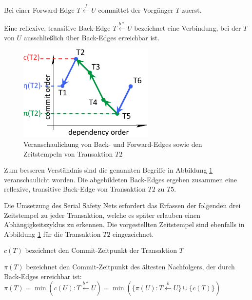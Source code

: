 \begin{Definition}
	Bei einer \textcolor{my-blue}{Forward-Edge} $T\xleftarrow{f} U$ committet der Vorgänger $T$ zuerst.
\end{Definition}

\begin{Definition}
	Eine \textcolor{my-green}{reflexive, transitive Back-Edge} $T\xleftarrow{b*} U$ bezeichnet eine Verbindung, bei der $T$ von $U$ ausschließlich über Back-Edges erreichbar ist.
\end{Definition}

\begin{figure}
	\includegraphics[width=0.8\columnwidth]{img/Figure_2_1.pdf}
	\caption{Veranschaulichung von \textcolor{my-green}{Back}- und \textcolor{my-blue}{Forward-Edges} sowie den Zeitstempeln von Transaktion $T2$}
	\label{fig:back_forward}
\end{figure}

Zum besseren Verständnis sind die genannten Begriffe in Abbildung \ref{fig:back_forward} veranschaulicht worden.
Die abgebildeten Back-Edges ergeben zusammen eine reflexive, transitive Back-Edge von Transaktion $T2$ zu $T5$.

Die Umsetzung des Serial Safety Nets erfordert das Erfassen der folgenden drei Zeitstempel zu jeder Transaktion, welche es später erlauben einen Abhängigkeitszyklus zu erkennen.
Die vorgestellten Zeitstempel sind ebenfalls in Abbildung \ref{fig:back_forward} für die Transaktion $T2$ eingezeichnet.

\begin{Definition}
	\textcolor{my-red}{$c(T)$} bezeichnet den Commit-Zeitpunkt der Transaktion $T$
\end{Definition}

\begin{Definition}
	\textcolor{my-green}{$\pi (T)$} bezeichnet den Commit-Zeitpunkt des ältesten Nachfolgers, der durch Back-Edges erreichbar ist:\\		
	$\pi (T)=\min (c(U):T\xleftarrow{b*}U)=\min (\{\pi (U):T\xleftarrow{b}U\}\cup \{c(T)\})$
\end{Definition}


